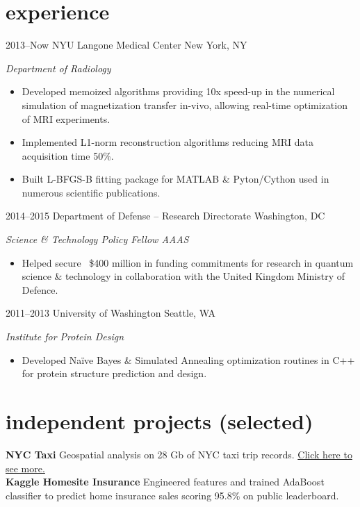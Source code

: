 \documentclass[]{friggeri-cv} %
\begin{document}

\section{experience}


\begin{entrylist}


\entry
{2013--Now}
{NYU Langone Medical Center}
{New York, NY}
{\emph{Department of Radiology}
\begin{itemize}
\item Developed memoized algorithms providing 10x speed-up in the numerical simulation of magnetization transfer in-vivo, allowing real-time optimization of MRI experiments.
\item Implemented L1-norm reconstruction algorithms reducing MRI data acquisition time 50\%.  
\item Built L-BFGS-B fitting package for MATLAB \& Pyton/Cython used in numerous scientific publications.    
\end{itemize}}

\entry
{2014--2015}
{Department of Defense -- Research Directorate}
{Washington, DC}
{\emph{Science \& Technology Policy Fellow AAAS}
\begin{itemize}
\item Helped secure ~\$400 million in funding commitments for research in quantum science \& technology in collaboration with the United Kingdom Ministry of Defence. 
\end{itemize}}

\entry
{2011--2013}
{University of Washington}
{Seattle, WA}
{\emph{Institute for Protein Design}
\begin{itemize}
\item Developed Na{\"i}ve Bayes \& Simulated Annealing optimization routines in C++ for protein structure prediction and design.\end{itemize}}


\end{entrylist}

\section{independent projects (selected)}
\textbf {{NYC Taxi}} Geospatial analysis on 28 Gb of NYC taxi trip records.  \href{https://cdn.rawgit.com/jfried23/nyc_taxi/1dbe38597f48650e661d613fcdb777e62b995bc7/html/chord_example/chord.html}{Click here to see more.}\\
\textbf{{Kaggle Homesite Insurance}}  Engineered features and trained AdaBoost classifier to predict home insurance sales scoring 95.8\% on public leaderboard. \\
\end{document}
